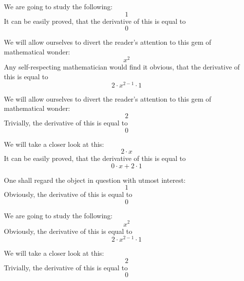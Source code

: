 \documentclass{article}
\begin{document}
We are going to study the following:
\begin{equation}
1 
\end{equation}
It can be easily proved, that the derivative of this is equal to
\begin{equation}
0 
\end{equation}

We will allow ourselves to divert the reader's attention to this gem of mathematical wonder:
\begin{equation}
x ^{2 } 
\end{equation}
Any self-respecting mathematician would find it obvious, that the derivative of this is equal to
\begin{equation}
2 \cdot x ^{2 - 1 } \cdot 1 
\end{equation}

We will allow ourselves to divert the reader's attention to this gem of mathematical wonder:
\begin{equation}
2 
\end{equation}
Trivially, the derivative of this is equal to
\begin{equation}
0 
\end{equation}

We will take a closer look at this:
\begin{equation}
2 \cdot x 
\end{equation}
It can be easily proved, that the derivative of this is equal to
\begin{equation}
0 \cdot x + 2 \cdot 1 
\end{equation}

One shall regard the object in question with utmost interest:
\begin{equation}
1 
\end{equation}
Obviously, the derivative of this is equal to
\begin{equation}
0 
\end{equation}

We are going to study the following:
\begin{equation}
x ^{2 } 
\end{equation}
Obviously, the derivative of this is equal to
\begin{equation}
2 \cdot x ^{2 - 1 } \cdot 1 
\end{equation}

We will take a closer look at this:
\begin{equation}
2 
\end{equation}
Trivially, the derivative of this is equal to
\begin{equation}
0 
\end{equation}
\end{document}
